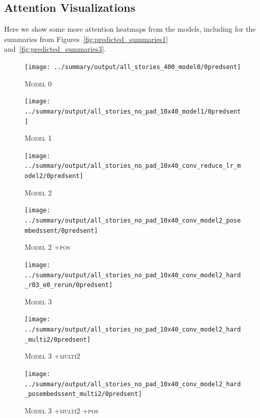 \documentclass[12pt]{report}
\begin{document}
\begin{appendices}
\chapter{Attention Visualizations}
\label{appendix:attn}

Here we show some more attention heatmaps from the models, including for the summaries from Figures~\ref{fig:predicted_summaries1} and~\ref{fig:predicted_summaries3}.

\begin{figure}[p]
\centering
\texttt{[image: ../summary/output/all\_stories\_400\_model0/0predsent]}
\caption[\textsc{Model 0} Attention]{\textsc{Model 0}}
\end{figure}

\begin{figure}[p]
\centering
\texttt{[image: ../summary/output/all\_stories\_no\_pad\_10x40\_model1/0predsent]}
\caption[\textsc{Model 1} Attention]{\textsc{Model 1}}
\end{figure}

\begin{figure}[p]
\centering
\texttt{[image: ../summary/output/all\_stories\_no\_pad\_10x40\_conv\_reduce\_lr\_model2/0predsent]}
\caption[\textsc{Model 2} Attention]{\textsc{Model 2}}
\end{figure}

\begin{figure}[p]
\centering
\texttt{[image: ../summary/output/all\_stories\_no\_pad\_10x40\_conv\_model2\_posembedssent/0predsent]}
\caption[\textsc{Model 2 +pos} Attention]{\textsc{Model 2 +pos}}
\end{figure}

\begin{figure}[p]
\centering
\texttt{[image: ../summary/output/all\_stories\_no\_pad\_10x40\_conv\_model2\_hard\_r03\_e0\_rerun/0predsent]}
\caption[\textsc{Model 3} Attention]{\textsc{Model 3}}
\end{figure}

\begin{figure}[p]
\centering
\texttt{[image: ../summary/output/all\_stories\_no\_pad\_10x40\_conv\_model2\_hard\_multi2/0predsent]}
\caption[\textsc{Model 3 +multi2} Attention]{\textsc{Model 3 +multi2}}
\end{figure}

\begin{figure}[p]
\centering
\texttt{[image: ../summary/output/all\_stories\_no\_pad\_10x40\_conv\_model2\_hard\_posembedssent\_multi2/0predsent]}
\caption[\textsc{Model 3 +multi2 +pos} Attention]{\textsc{Model 3 +multi2 +pos}}
\end{figure}


\end{appendices}
\end{document}
